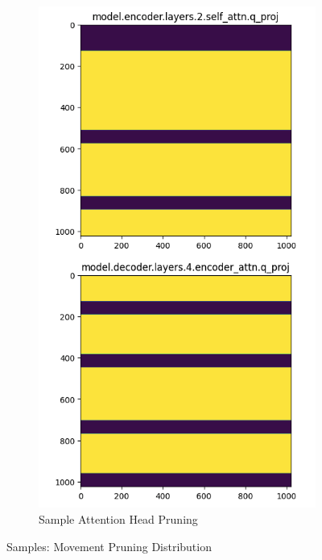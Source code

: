 \documentclass{article}
\begin{document}
\begin{figure}[h!]
\begin{subfigure}[b]{0.35\textwidth}
            \includegraphics[width=\textwidth]{pics/pa/pruning2}
            \caption{Sample Attention Head Pruning}
            \label{fig:subfig2}
        \end{subfigure}
        \caption{Samples: Movement Pruning Distribution}
        \label{fig:two_images_subcaption}
    \end{figure}
\end{document}
